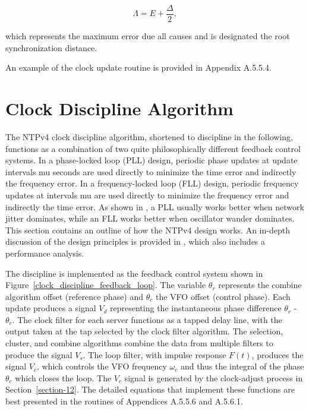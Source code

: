 $$
\Lambda = E + \frac{\Delta}{2},
$$

which represents the maximum error due all causes and is designated
the root synchronization distance.

An example of the clock update routine is provided in
Appendix A.5.5.4.

\section{Clock Discipline Algorithm}
\label{section-11-3}

The NTPv4 clock discipline algorithm, shortened to discipline in the
following, functions as a combination of two quite philosophically
different feedback control systems. In a phase-locked loop (PLL)
design, periodic phase updates at update intervals mu seconds are
used directly to minimize the time error and indirectly the frequency
error. In a frequency-locked loop (FLL) design, periodic frequency
updates at intervals mu are used directly to minimize the frequency
error and indirectly the time error. As shown in \cite{ref7}, a PLL
usually works better when network jitter dominates, while an FLL
works better when oscillator wander dominates. This section contains
an outline of how the NTPv4 design works. An in-depth discussion of
the design principles is provided in \cite{ref7}, which also includes a
performance analysis.

The discipline is implemented as the feedback control system shown in
Figure~\ref{clock_discipline_feedback_loop}. The variable $ \theta_r $ represents the combine algorithm
offset (reference phase) and $ \theta_c $ the VFO offset (control phase).
Each update produces a signal $ V_d $ representing the instantaneous
phase difference $ \theta_r $ - $ \theta_c $. The clock filter for each server
functions as a tapped delay line, with the output taken at the tap
selected by the clock filter algorithm. The selection, cluster, and
combine algorithms combine the data from multiple filters to produce
the signal $ V_s $. The loop filter, with impulse response $ F(t) $,
produces the signal $ V_c $, which controls the VFO frequency $ \omega_c $ and
thus the integral of the phase $ \theta_c $ which closes the loop. The
$ V_c $ signal is generated by the clock-adjust process in Section~\ref{section-12}.
The detailed equations that implement these functions are best
presented in the routines of Appendices A.5.5.6 and A.5.6.1.


